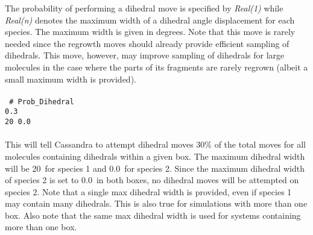The probability of performing a dihedral move is specified by {\it Real(1)} while
{\it Real(n)} denotes the maximum width of a dihedral angle displacement for each species. The maximum width is given in degrees. Note that this move is rarely needed since the regrowth moves should already provide efficient sampling of dihedrals. This move, however, may improve sampling of dihedrals for large molecules in the case where the parts of its fragments are rarely regrown (albeit a small maximum width is provided).\\ \\
%
\texttt{
\# Prob\_Dihedral \\
0.3 \\
20 0.0 \\
}\\
%
This will tell Cassandra to attempt dihedral moves 30\% of the total moves for all molecules containing dihedrals within a given box.
The maximum dihedral width will be 20\degree\ for species 1 and 0.0\degree\
for species 2. Since the maximum dihedral
width of species 2 is set to 0.0\degree\ in both boxes, no dihedral moves will be
attempted on species 2. Note that a single max dihedral width is provided, even if species 1 may contain many dihedrals. This is also true
for simulations with more than one box. Also note that the same max dihedral width is used for systems containing  more than one box.

%
%
%
